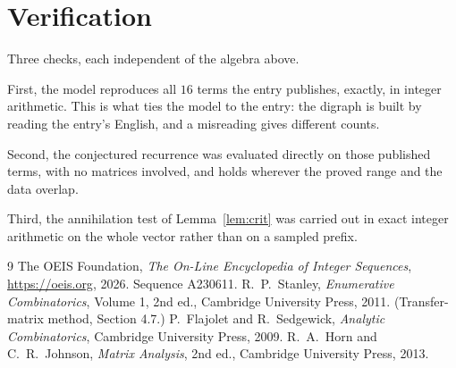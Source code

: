 \documentclass[11pt,a4paper]{article}
\theoremstyle{plain}
\theoremstyle{definition}
\begin{document}
\section{Verification}

Three checks, each independent of the algebra above.

First, the model reproduces all $16$ terms the entry publishes, exactly, in integer
arithmetic. This is what ties the model to the entry: the digraph is built by reading the
entry's English, and a misreading gives different counts.

Second, the conjectured recurrence was evaluated directly on those published terms, with no
matrices involved, and holds wherever the proved range and the data overlap.

Third, the annihilation test of Lemma~\ref{lem:crit} was carried out in exact integer
arithmetic on the whole vector rather than on a sampled prefix.

\begin{thebibliography}{9}
 The OEIS Foundation, \emph{The On-Line Encyclopedia of Integer
Sequences}, \url{https://oeis.org}, 2026. Sequence A230611.
 R.~P.~Stanley, \emph{Enumerative Combinatorics}, Volume 1, 2nd ed.,
Cambridge University Press, 2011. (Transfer-matrix method, Section 4.7.)
 P.~Flajolet and R.~Sedgewick, \emph{Analytic Combinatorics}, Cambridge
University Press, 2009.
 R.~A.~Horn and C.~R.~Johnson, \emph{Matrix Analysis}, 2nd ed., Cambridge
University Press, 2013.
\end{thebibliography}
\end{document}
